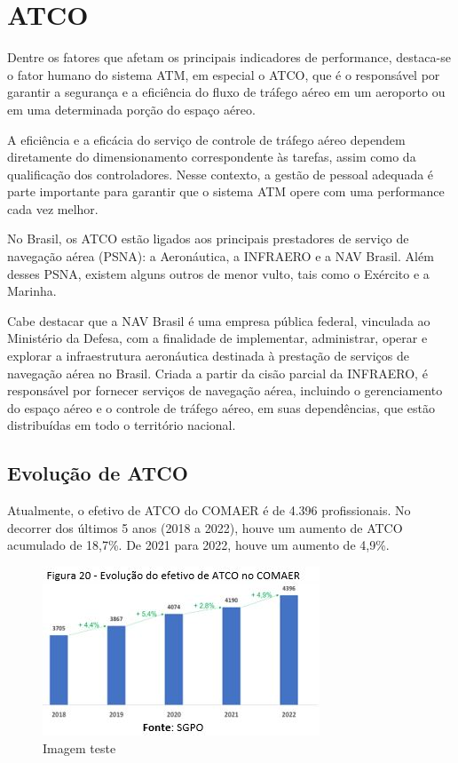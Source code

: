 \documentclass[
]{book}
\begin{document}
\hypertarget{atco}{%
\section{ATCO}\label{atco}}

Dentre os fatores que afetam os principais indicadores de performance, destaca-se o fator humano do sistema ATM, em especial o ATCO, que é o responsável por garantir a segurança e a eficiência do fluxo de tráfego aéreo em um aeroporto ou em uma determinada porção do espaço aéreo.

A eficiência e a eficácia do serviço de controle de tráfego aéreo dependem diretamente do dimensionamento correspondente às tarefas, assim como da qualificação dos controladores. Nesse contexto, a gestão de pessoal adequada é parte importante para garantir que o sistema ATM opere com uma performance cada vez melhor.

No Brasil, os ATCO estão ligados aos principais prestadores de serviço de navegação aérea (PSNA): a Aeronáutica, a INFRAERO e a NAV Brasil. Além desses PSNA, existem alguns outros de menor vulto, tais como o Exército e a Marinha.

Cabe destacar que a NAV Brasil é uma empresa pública federal, vinculada ao Ministério da Defesa, com a finalidade de implementar, administrar, operar e explorar a infraestrutura aeronáutica destinada à prestação de serviços de navegação aérea no Brasil. Criada a partir da cisão parcial da INFRAERO, é responsável por fornecer serviços de navegação aérea, incluindo o gerenciamento do espaço aéreo e o controle de tráfego aéreo, em suas dependências, que estão distribuídas em todo o território nacional.

\hypertarget{evoluuxe7uxe3o-de-atco}{%
\subsection{Evolução de ATCO}\label{evoluuxe7uxe3o-de-atco}}

Atualmente, o efetivo de ATCO do COMAER é de 4.396 profissionais. No decorrer dos últimos 5 anos (2018 a 2022), houve um aumento de ATCO acumulado de 18,7\%. De 2021 para 2022, houve um aumento de 4,9\%.

\begin{figure}
\centering
\includegraphics{imagens/fig23.jpg}
\caption{Imagem teste}
\end{figure}
\end{document}
